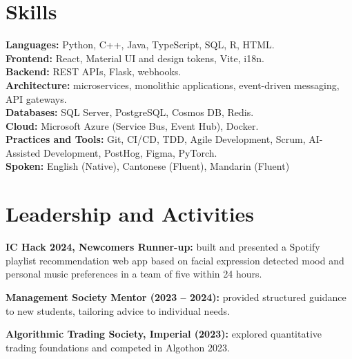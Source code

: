 \documentclass[10pt,a4paper]{article}
\newcommand{\lead}[1]{\textbf{#1}}
\begin{document}
\section{Skills}
\lead{Languages:} Python, C++, Java, TypeScript, SQL, R, HTML.\\
\lead{Frontend:} React, Material UI and design tokens, Vite, i18n.\\
\lead{Backend:} REST APIs, Flask, webhooks.\\
\lead{Architecture:} microservices, monolithic applications, event-driven messaging, API gateways.\\
\lead{Databases:} SQL Server, PostgreSQL, Cosmos DB, Redis.\\
\lead{Cloud:} Microsoft Azure (Service Bus, Event Hub), Docker.\\
\lead{Practices and Tools:} Git, CI/CD, TDD, Agile Development, Scrum, AI-Assisted Development, PostHog, Figma, PyTorch.\\
\lead{Spoken:} English (Native), Cantonese (Fluent), Mandarin (Fluent)

\section{Leadership and Activities}
\begin{bul}
  \item \lead{IC Hack 2024, Newcomers Runner-up:} built and presented a Spotify playlist recommendation web app based on facial expression detected mood and personal music preferences in a team of five within 24 hours.
  \item \lead{Management Society Mentor (2023 -- 2024):} provided structured guidance to new students, tailoring advice to individual needs.
  \item \lead{Algorithmic Trading Society, Imperial (2023):} explored quantitative trading foundations and competed in Algothon 2023.
\end{bul}
\end{document}
